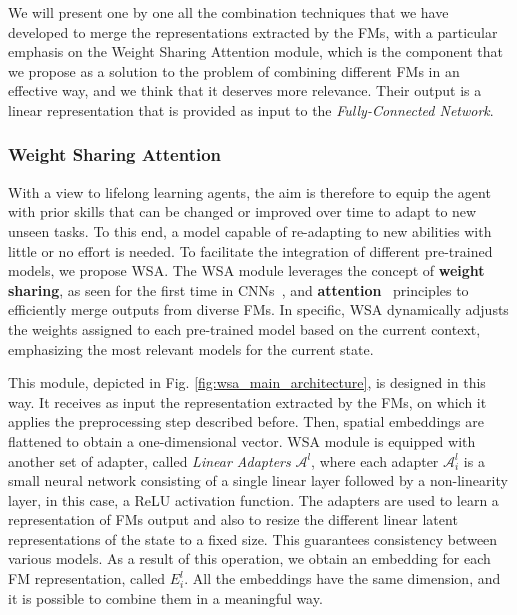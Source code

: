 We will present one by one all the combination techniques that we have developed to merge the representations extracted by the FMs, with a particular emphasis on the Weight Sharing Attention module, which is the component that we propose as a solution to the problem of combining different FMs in an effective way, and we think that it deserves more relevance.
Their output is a linear representation that is provided as input to the \textit{Fully-Connected Network}.

\subsubsection{Weight Sharing Attention}\label{subsubsec:wsa}
With a view to lifelong learning agents, the aim is therefore to equip the agent with prior skills that can be changed or improved over time to adapt to new unseen tasks.
To this end, a model capable of re-adapting to new abilities with little or no effort is needed.
To facilitate the integration of different pre-trained models, we propose WSA\@.
The WSA module leverages the concept of \textbf{weight sharing}, as seen for the first time in CNNs~\citep{fukushima1980neocognitron}, and \textbf{attention}~\citep{vaswani2017attention} principles to efficiently merge outputs from diverse FMs.
In specific, WSA dynamically adjusts the weights assigned to each pre-trained model based on the current context, emphasizing the most relevant models for the current state.

This module, depicted in Fig. \ref{fig:wsa_main_architecture}, is designed in this way.
It receives as input the representation extracted by the FMs, on which it applies the preprocessing step described before.
Then, spatial embeddings are flattened to obtain a one-dimensional vector.
WSA module is equipped with another set of adapter, called \textit{Linear Adapters} $\mathcal{A}^{l}$, where each adapter $\mathcal{A}^{l}_i$ is a small neural network consisting of a single linear layer followed by a non-linearity layer, in this case, a ReLU activation function.
The adapters are used to learn a representation of FMs output and also to resize the different linear latent representations of the state to a fixed size.
This guarantees consistency between various models.
As a result of this operation, we obtain an embedding for each FM representation, called $E^{l}_i$.
All the embeddings have the same dimension, and it is possible to combine them in a meaningful way.


